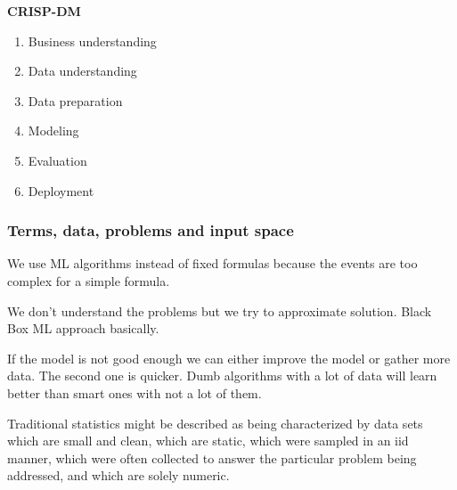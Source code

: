 \textbf{CRISP-DM}
\begin{enumerate}
    \item Business understanding
    \item Data understanding
    \item Data preparation
    \item Modeling
    \item Evaluation
    \item Deployment
\end{enumerate}



\vspace{10pt}



\subsubsection{Terms, data, problems and input space}


We use ML algorithms instead of fixed formulas because the events are too complex for a simple formula.

We don't understand the problems but we try to approximate solution. Black Box ML approach basically.

\vspace{10pt}

If the model is not good enough we can either improve the model or gather more data. The second one is quicker. Dumb algorithms with a lot of data will learn better than smart ones with not a lot of them.

\vspace{10pt}

Traditional statistics might be described as being characterized
by data sets which are small and clean, which are static,
which were sampled in an iid manner, which were often
collected to answer the particular problem being addressed,
and which are solely numeric.

